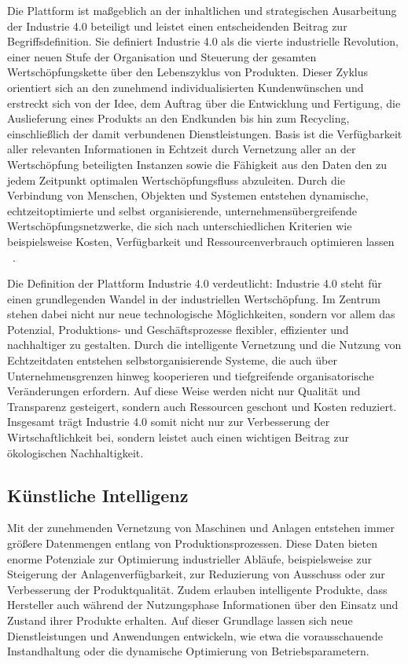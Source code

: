 Die Plattform ist maßgeblich an der inhaltlichen und strategischen Ausarbeitung der Industrie 4.0 beteiligt und leistet einen entscheidenden Beitrag zur Begriffsdefinition. 
Sie definiert Industrie 4.0 als
\glqq die vierte industrielle Revolution, einer neuen Stufe der Organisation und Steuerung der gesamten Wertschöpfungskette über den Lebenszyklus von Produkten.
Dieser Zyklus orientiert sich an den zunehmend individualisierten Kundenwünschen und erstreckt sich von der Idee, dem Auftrag über die Entwicklung und Fertigung, die Auslieferung eines Produkts an den Endkunden bis hin zum Recycling, einschließlich der damit verbundenen Dienstleistungen.
Basis ist die Verfügbarkeit aller relevanten Informationen in Echtzeit durch Vernetzung aller an der Wertschöpfung beteiligten Instanzen sowie die Fähigkeit aus den Daten den zu jedem Zeitpunkt optimalen Wertschöpfungsfluss abzuleiten. 
Durch die Verbindung von Menschen, Objekten und Systemen entstehen dynamische, echtzeitoptimierte und selbst organisierende, unternehmensübergreifende Wertschöpfungsnetzwerke, die sich nach unterschiedlichen Kriterien wie beispielsweise Kosten, Verfügbarkeit und Ressourcenverbrauch optimieren lassen \grqq~\cite[S. 8]{plattform_i40_definition}.

\newpage
Die Definition der Plattform Industrie 4.0 verdeutlicht: Industrie 4.0 steht für einen grundlegenden Wandel in der industriellen Wertschöpfung.
Im Zentrum stehen dabei nicht nur neue technologische Möglichkeiten, sondern vor allem das Potenzial, Produktions- und Geschäftsprozesse flexibler, effizienter und nachhaltiger zu gestalten.
Durch die intelligente Vernetzung und die Nutzung von Echtzeitdaten entstehen selbstorganisierende Systeme, die auch über Unternehmensgrenzen hinweg kooperieren und tiefgreifende organisatorische Veränderungen erfordern.
Auf diese Weise werden nicht nur Qualität und Transparenz gesteigert, sondern auch Ressourcen geschont und Kosten reduziert.
Insgesamt trägt Industrie 4.0 somit nicht nur zur Verbesserung der Wirtschaftlichkeit bei, sondern leistet auch einen wichtigen Beitrag zur ökologischen Nachhaltigkeit.

\subsection{Künstliche Intelligenz}
Mit der zunehmenden Vernetzung von Maschinen und Anlagen entstehen immer größere Datenmengen entlang von Produktionsprozessen.
Diese Daten bieten enorme Potenziale zur Optimierung industrieller Abläufe, beispielsweise zur Steigerung der Anlagenverfügbarkeit, zur Reduzierung von Ausschuss oder zur Verbesserung der Produktqualität.
Zudem erlauben intelligente Produkte, dass Hersteller auch während der Nutzungsphase Informationen über den Einsatz und Zustand ihrer Produkte erhalten.
Auf dieser Grundlage lassen sich neue Dienstleistungen und Anwendungen entwickeln, wie etwa die vorausschauende Instandhaltung oder die dynamische Optimierung von Betriebsparametern.

